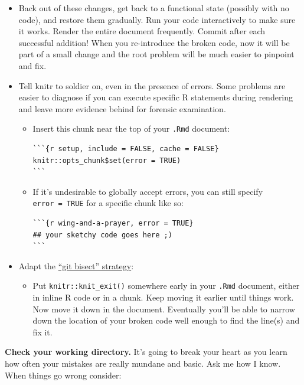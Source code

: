 \documentclass[
]{book}
\providecommand{\tightlist}{%
  \setlength{\itemsep}{0pt}\setlength{\parskip}{0pt}}
\begin{document}
\begin{itemize}
\tightlist
\item
  Back out of these changes, get back to a functional state (possibly with no
  code), and restore them gradually. Run your code interactively to make sure it
  works. Render the entire document frequently. Commit after each successful
  addition! When you re-introduce the broken code, now it will be part of a
  small change and the root problem will be much easier to pinpoint and fix.
\item
  Tell knitr to soldier on, even in the presence of errors. Some problems are
  easier to diagnose if you can execute specific R statements during rendering
  and leave more evidence behind for forensic examination.

  \begin{itemize}
  \item
    Insert this chunk near the top of your \texttt{.Rmd} document:

\begin{verbatim}
```{r setup, include = FALSE, cache = FALSE}
knitr::opts_chunk$set(error = TRUE)
```
\end{verbatim}
  \item
    If it's undesirable to globally accept errors, you can still specify
    \texttt{error\ =\ TRUE} for a specific chunk like so:

\begin{verbatim}
```{r wing-and-a-prayer, error = TRUE}
## your sketchy code goes here ;)
```
\end{verbatim}
  \end{itemize}
\item
  Adapt the \href{http://webchick.net/node/99}{``git bisect'' strategy}:

  \begin{itemize}
  \tightlist
  \item
    Put \texttt{knitr::knit\_exit()} somewhere early in your \texttt{.Rmd} document, either in
    inline R code or in a chunk.
    Keep moving it earlier until things work.
    Now move it down in the document.
    Eventually you'll be able to narrow down the location of your broken code
    well enough to find the line(s) and fix it.
  \end{itemize}
\end{itemize}

\textbf{Check your working directory.}
It's going to break your heart as you learn how often your mistakes are really mundane and basic.
Ask me how I know.
When things go wrong consider:
\end{document}

